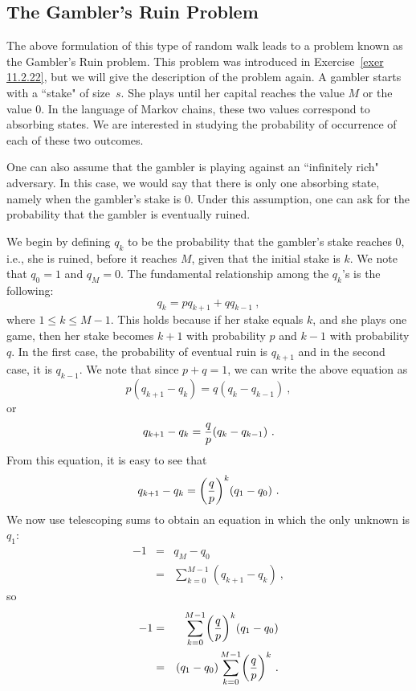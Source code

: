 \subsection*{The Gambler's Ruin Problem}

The above formulation of this type of random walk leads to a problem known as the Gambler's Ruin
problem.  This problem was introduced in Exercise~\ref{exer 11.2.22}, but
we will give the description of the problem again.  A gambler starts with a ``stake" of size~$s$. 
She plays until her capital reaches the value $M$ or the value 0.  In the language of Markov 
chains, these two values correspond to absorbing states.  We
are interested in studying the probability of occurrence of each of these two outcomes.  
\par
One can also assume that the gambler is playing against an ``infinitely rich" adversary.  In this
case, we  would say that there is only one absorbing state, namely when the gambler's stake is 0. 
Under this assumption, one can ask for the probability that the gambler is eventually ruined. 
\par
We begin by defining $q_k$ to be the probability that the gambler's stake reaches 0, i.e.,
she is ruined, before it reaches $M$, given that the initial stake is $k$.  We note that $q_0 =
1$ and $q_M = 0$.  The fundamental relationship among the $q_k$'s is the following:
$$q_k = pq_{k+1} + qq_{k-1}\ ,$$
where $1 \le k \le M-1$.  This holds because if her stake equals $k$, and she plays one game,
then her stake becomes $k+1$ with probability $p$ and $k-1$ with probability $q$.  In the first
case, the probability of eventual ruin is $q_{k+1}$ and in the second case, it is $q_{k-1}$. 
We note that since $p + q = 1$, we can write the above equation as
$$p(q_{k+1} - q_k) = q(q_k - q_{k-1})\ ,$$
or
$$q_{k+1} - q_k = {q\over p}(q_k - q_{k-1})\ .$$
From this equation, it is easy to see that
\begin{equation}
q_{k+1} - q_k = \biggl({q\over p}\biggr)^k(q_1 - q_0)\ .
\label{eq 12.2.2}
\end{equation}
We now use telescoping sums to obtain an equation in which the only unknown is $q_1$:
\begin{eqnarray*}
-1 &=& q_M - q_0 \\
   &=& \sum_{k = 0}^{M-1} (q_{k+1} - q_k)\ ,
\end{eqnarray*}
so
\begin{eqnarray*}
-1 &=& \sum_{k = 0}^{M-1} \biggl({q\over p}\biggr)^k(q_1 - q_0)\\
   &=& (q_1 - q_0) \sum_{k = 0}^{M-1} \biggl({q\over p}\biggr)^k\ .
\end{eqnarray*}
